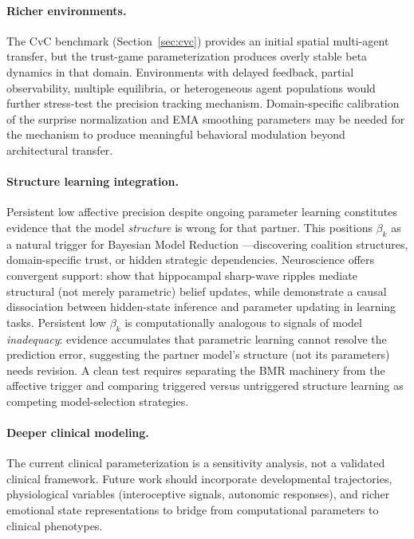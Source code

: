 \documentclass[11pt,a4paper]{article}
\begin{document}
\paragraph{Richer environments.}
The CvC benchmark (Section~\ref{sec:cvc}) provides an initial spatial multi-agent transfer, but the trust-game parameterization produces overly stable beta dynamics in that domain. Environments with delayed feedback, partial observability, multiple equilibria, or heterogeneous agent populations would further stress-test the precision tracking mechanism. Domain-specific calibration of the surprise normalization and EMA smoothing parameters may be needed for the mechanism to produce meaningful behavioral modulation beyond architectural transfer.

\paragraph{Structure learning integration.}
Persistent low affective precision despite ongoing parameter learning constitutes evidence that the model \emph{structure} is wrong for that partner. This positions $\beta_k$ as a natural trigger for Bayesian Model Reduction \citep{smith2020structure}---discovering coalition structures, domain-specific trust, or hidden strategic dependencies. Neuroscience offers convergent support: \citet{behrens2025hippocampal} show that hippocampal sharp-wave ripples mediate structural (not merely parametric) belief updates, while \citet{mishchanchuk2024causal} demonstrate a causal dissociation between hidden-state inference and parameter updating in learning tasks. Persistent low $\beta_k$ is computationally analogous to signals of model \emph{inadequacy}: evidence accumulates that parametric learning cannot resolve the prediction error, suggesting the partner model's structure (not its parameters) needs revision. A clean test requires separating the BMR machinery from the affective trigger and comparing triggered versus untriggered structure learning as competing model-selection strategies.

\paragraph{Deeper clinical modeling.}
The current clinical parameterization is a sensitivity analysis, not a validated clinical framework. Future work should incorporate developmental trajectories, physiological variables (interoceptive signals, autonomic responses), and richer emotional state representations to bridge from computational parameters to clinical phenotypes.
\end{document}
